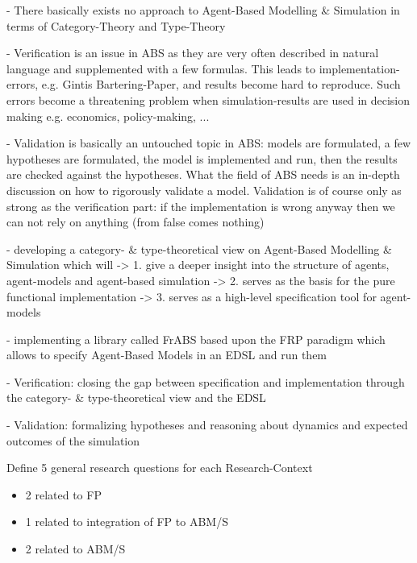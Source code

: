 - There basically exists no approach to Agent-Based Modelling \& Simulation in terms of Category-Theory and Type-Theory

- Verification is an issue in ABS as they are very often described in natural language and supplemented with a few formulas. This leads to implementation-errors, e.g. Gintis Bartering-Paper, and results become hard to reproduce. Such errors become a threatening problem when simulation-results are used in decision making e.g. economics, policy-making, ...

- Validation is basically an untouched topic in ABS: models are formulated, a few hypotheses are formulated, the model is implemented and run, then the results are checked against the hypotheses. What the field of ABS needs is an in-depth discussion on how to rigorously validate a model. Validation is of course only as strong as the verification part: if the implementation is wrong anyway then we can not rely on anything (from false comes nothing)


- developing a category- \& type-theoretical view on Agent-Based Modelling \& Simulation which will 
	-> 1. give a deeper insight into the structure of agents, agent-models and agent-based simulation
	-> 2. serves as the basis for the pure functional implementation
	-> 3. serves as a high-level specification tool for agent-models

- implementing a library called FrABS based upon the FRP paradigm which allows to specify Agent-Based Models in an EDSL and run them

- Verification: closing the gap between specification and implementation through the category- \& type-theoretical view and the EDSL

- Validation: formalizing hypotheses and reasoning about dynamics and expected outcomes of the simulation

Define 5 general research questions for each Research-Context
	\begin{itemize}
    \item 2 related to FP
    \item 1 related to integration of FP to ABM/S
    \item 2 related to ABM/S
    \end{itemize}
    
